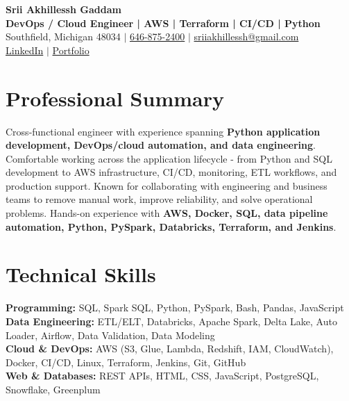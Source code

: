 \documentclass[letterpaper,10pt]{article}
\begin{document}
\fontsize{9.35pt}{10.45pt}\selectfont

\begin{center}
    {\LARGE \textbf{Srii Akhillessh Gaddam}} \\[-1pt]
    \textbf{DevOps / Cloud Engineer | AWS | Terraform | CI/CD | Python} \\[2pt]
    Southfield, Michigan 48034 $|$
    \href{tel:6468752400}{646-875-2400} $|$
    \href{mailto:sriiakhillessh@gmail.com}{sriiakhillessh@gmail.com} \\[1pt]
    \href{https://www.linkedin.com/in/srii-akhiilessh-gaddam-b48668191/}{LinkedIn} $|$
    \href{https://sriiakhillesshg.github.io/portfolio/}{Portfolio}
\end{center}
\vspace{-8pt}

\section{Professional Summary}
\small{Cross-functional engineer with experience spanning \textbf{Python application development, DevOps/cloud automation, and data engineering}. Comfortable working across the application lifecycle - from Python and SQL development to AWS infrastructure, CI/CD, monitoring, ETL workflows, and production support. Known for collaborating with engineering and business teams to remove manual work, improve reliability, and solve operational problems. Hands-on experience with \textbf{AWS, Docker, SQL, data pipeline automation, Python, PySpark, Databricks, Terraform, and Jenkins}.}

\section{Technical Skills}
\small{
\textbf{Programming:} SQL, Spark SQL, Python, PySpark, Bash, Pandas, JavaScript \\
\textbf{Data Engineering:} ETL/ELT, Databricks, Apache Spark, Delta Lake, Auto Loader, Airflow, Data Validation, Data Modeling \\
\textbf{Cloud \& DevOps:} AWS (S3, Glue, Lambda, Redshift, IAM, CloudWatch), Docker, CI/CD, Linux, Terraform, Jenkins, Git, GitHub \\
\textbf{Web \& Databases:} REST APIs, HTML, CSS, JavaScript, PostgreSQL, Snowflake, Greenplum
}
\end{document}
